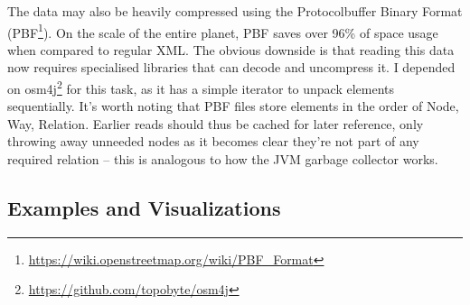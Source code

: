 The data may also be heavily compressed using the Protocolbuffer Binary Format (PBF\footnote{\url{https://wiki.openstreetmap.org/wiki/PBF_Format}}). On the scale of the entire planet, PBF saves over 96\% of space usage when compared to regular XML. The obvious downside is that reading this data now requires specialised libraries that can decode and uncompress it. I depended on osm4j\footnote{\url{https://github.com/topobyte/osm4j}} for this task, as it has a simple iterator to unpack elements sequentially. It's worth noting that PBF files store elements in the order of Node, Way, Relation. Earlier reads should thus be cached for later reference, only throwing away unneeded nodes as it becomes clear they're not part of any required relation -- this is analogous to how the JVM garbage collector works.

\subsection{Examples and Visualizations}
